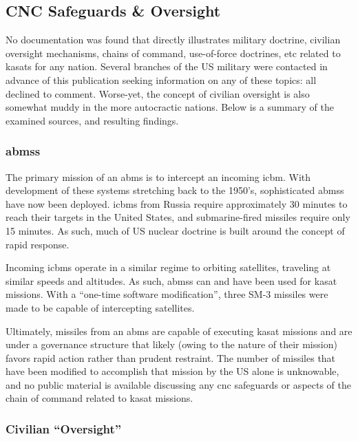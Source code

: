 \subsection{CNC Safeguards \& Oversight}

No documentation was found that directly illustrates military
doctrine, civilian oversight mechanisms, chains of command,
use-of-force doctrines, etc related to \acp{kasat} for any nation.
Several branches of the US military were contacted in advance of this
publication seeking information on any of these topics: all declined
to comment.  Worse-yet, the concept of civilian oversight is also
somewhat muddy in the more autocractic nations.  Below is a summary of
the examined sources, and resulting findings.


\subsubsection{\acfp{abms}}

The primary mission of an \acf{abms} is to intercept an incoming
\ac{icbm}.  With development of these systems stretching back to the
1950's\cite[p01-10]{brian}, sophisticated \acp{abms} have now been
deployed.\cite[p01-15]{brian} \acp{icbm} from Russia require
approximately 30 minutes to reach their targets in the United States,
and submarine-fired missiles require only 15 minutes.\cite{cnc-primer}
As such, much of US nuclear doctrine is built around the concept of
rapid response.\cite{cnc-primer}

Incoming \acp{icbm} operate in a similar regime to orbiting
satellites, traveling at similar speeds and
altitudes.\cite[p01-15]{brian} As such, \acp{abms} can and have been
used for \ac{kasat} missions.  With a ``one-time software
modification'', three SM-3 missiles were made to be capable of
intercepting satellites.\cite[p01-15]{brian}

Ultimately, missiles from an \ac{abms} are capable of executing
\ac{kasat} missions and are under a governance structure that likely
(owing to the nature of their mission) favors rapid action rather than
prudent restraint.  The number of missiles that have been modified to
accomplish that mission by the US alone is unknowable, and no public
material is available discussing any \ac{cnc} safeguards or aspects of
the chain of command related to \ac{kasat} missions.

\subsubsection{Civilian ``Oversight''}

